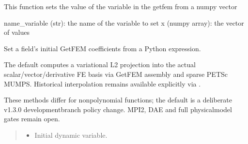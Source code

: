 \documentclass[letterpaper,10pt,english]{sphinxmanual}
\begin{document}
\begin{fulllineitems}
\begin{fulllineitems}
\label{\detokenize{scrimp:scrimp.dphs.DPHS.set_from_vector}}
\pysigstartsignatures
\pysiglinewithargsret
{}
{\sphinxparamcomma {}}
{}
\pysigstopsignatures
\sphinxAtStartPar
This function sets the value of the variable  in the getfem  from a numpy vector
\begin{description}
\sphinxAtStartPar
name\_variable (str): the name of the variable to set
x (numpy array): the vector of values

\end{description}

\end{fulllineitems}


\begin{fulllineitems}
\label{\detokenize{scrimp:scrimp.dphs.DPHS.set_initial_value}}
\pysigstartsignatures
\pysiglinewithargsret
{}
{\sphinxparamcomma {}\sphinxparamcomma {}\sphinxparamcomma {}\sphinxparamcomma {}}
{}
\pysigstopsignatures
\sphinxAtStartPar
Set a field’s initial GetFEM coefficients from a Python expression.

\sphinxAtStartPar
The default  computes a variational L2 projection
into the actual scalar/vector/derivative FE basis via GetFEM
assembly and sparse PETSc MUMPS. Historical interpolation remains
available explicitly via .

\sphinxAtStartPar
These methods differ for nonpolynomial functions; the default
is a deliberate v1.3.0 development\sphinxhyphen{}branch policy change.
MPI2, DAE and full physical\sphinxhyphen{}model gates remain open.
\begin{quote}\begin{description}
\begin{itemize}
\item {} 
\sphinxAtStartPar
{} \textendash{} Initial dynamic variable.


\end{itemize}
\end{description}
\end{quote}
\end{fulllineitems}
\end{fulllineitems}
\end{document}
